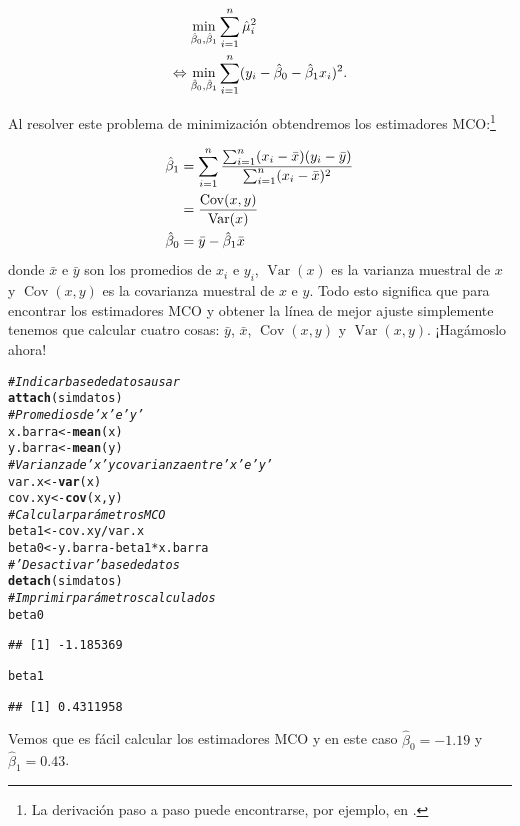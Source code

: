 \documentclass{report}\usepackage[]{graphicx}\usepackage[]{color}
\makeatletter
\newcommand{\hlcom}[1]{\textcolor[rgb]{0.678,0.584,0.686}{\textit{#1}}}%
\newcommand{\hlopt}[1]{\textcolor[rgb]{0,0,0}{#1}}%
\newcommand{\hlstd}[1]{\textcolor[rgb]{0.345,0.345,0.345}{#1}}%
\newcommand{\hlkwb}[1]{\textcolor[rgb]{0.69,0.353,0.396}{#1}}%
\newcommand{\hlkwd}[1]{\textcolor[rgb]{0.737,0.353,0.396}{\textbf{#1}}}%
\newenvironment{kframe}{%
 \def\at@end@of@kframe{}%
 \ifinner\ifhmode%
  \def\at@end@of@kframe{\end{minipage}}%
  \begin{minipage}{\columnwidth}%
 \fi\fi%
 \def\FrameCommand##1{\hskip\@totalleftmargin \hskip-\fboxsep
 \colorbox{shadecolor}{##1}\hskip-\fboxsep
     \hskip-\linewidth \hskip-\@totalleftmargin \hskip\columnwidth}%
 \MakeFramed {\advance\hsize-\width
   \@totalleftmargin\z@ \linewidth\hsize
   \@setminipage}}%
 {\par\unskip\endMakeFramed%
 \at@end@of@kframe}
\newenvironment{knitrout}{}{} %
\newcommand{\Var}{\operatorname{Var}}
\newcommand{\Cov}{\operatorname{Cov}}
\makeatother
\begin{document}
\begin{align}
\min_{\hat\beta_0,\hat\beta_1} & \sum_{i=1}^n \hat\mu_i^2 \notag \\
\Leftrightarrow \min_{\hat\beta_0,\hat\beta_1} & \sum_{i=1}^n (y_i - \hat\beta_0 - \hat\beta_1 x_i)^2.
\label{eq:prob_min_MCO}
\end{align}

Al resolver este problema de minimización obtendremos los estimadores MCO:\footnote{La derivación paso a paso puede encontrarse, por ejemplo, en \textcite[cap. 2]{wooldridge_introductory_2013}.}

\begin{align}
\hat \beta_1 &= \sum_{i=1}^n \frac{\sum_{i=1}^n (x_i - \bar x)(y_i - \bar y)}{\sum_{i=1}^n (x_i - \bar x)^2} \notag \\
 &= \frac{\Cov (x,y)}{\Var(x)} \\
\hat \beta_0 &= \bar y - \hat\beta_1 \bar x
\end{align}
donde $\bar x$ e $\bar y$ son los promedios de $x_i$ e $y_i$, $\Var(x)$ es la varianza muestral de $x$ y $\Cov(x,y)$ es la covarianza muestral de $x$ e $y$.
Todo esto significa que para encontrar los estimadores MCO y obtener la línea de mejor ajuste simplemente tenemos que calcular cuatro cosas: $\bar y$, $\bar x$, $\Cov (x,y)$ y $\Var (x,y)$. ¡Hagámoslo ahora!

\begin{knitrout}
\color{fgcolor}\begin{kframe}
\begin{alltt}
\hlcom{# Indicar base de datos a usar}
\hlkwd{attach}\hlstd{(simdatos)}
\hlcom{# Promedios de 'x' e 'y'}
\hlstd{x.barra} \hlkwb{<-} \hlkwd{mean}\hlstd{(x)}
\hlstd{y.barra} \hlkwb{<-} \hlkwd{mean}\hlstd{(y)}
\hlcom{# Varianza de 'x' y covarianza entre 'x' e 'y'}
\hlstd{var.x} \hlkwb{<-} \hlkwd{var}\hlstd{(x)}
\hlstd{cov.xy} \hlkwb{<-} \hlkwd{cov}\hlstd{(x,y)}
\hlcom{# Calcular parámetros MCO}
\hlstd{beta1} \hlkwb{<-} \hlstd{cov.xy}\hlopt{/}\hlstd{var.x}
\hlstd{beta0} \hlkwb{<-} \hlstd{y.barra} \hlopt{-} \hlstd{beta1}\hlopt{*}\hlstd{x.barra}
\hlcom{# 'Desactivar' base de datos}
\hlkwd{detach}\hlstd{(simdatos)}
\hlcom{# Imprimir parámetros calculados}
\hlstd{beta0}
\end{alltt}
\begin{verbatim}
## [1] -1.185369
\end{verbatim}
\begin{alltt}
\hlstd{beta1}
\end{alltt}
\begin{verbatim}
## [1] 0.4311958
\end{verbatim}
\end{kframe}
\end{knitrout}
Vemos que es fácil calcular los estimadores MCO y en este caso $\hat \beta_0 = -1.19$ y $\hat \beta_1 = 0.43$.
\end{document}
